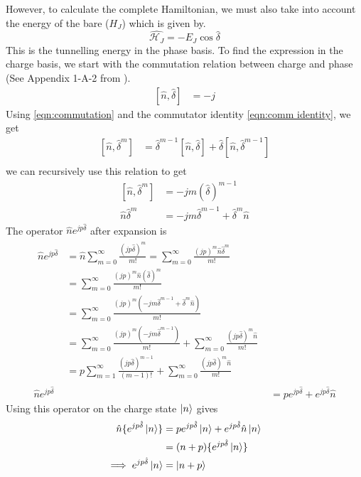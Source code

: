 However, to calculate the complete Hamiltonian, we must also take into account the energy of the bare \JJ ($H_J$) which is given by.
\begin{equation}
\hat{\mathcal{H}_J}=-E_J\cos\hat{\delta}
\end{equation}
This is the tunnelling energy in the phase basis. To find the expression in the charge basis, we start with the commutation relation between charge and phase (See Appendix 1-A-2 from \cite{Cottet2002d}).
\begin{align}
\left[\hat{n},\hat{\delta}\right]&=-j
\label{eqn:commutation}
\end{align}
Using \ref{eqn:commutation} and the commutator identity \ref{eqn:comm identity}, we get
\begin{align}
\left[\hat{n},\hat{\delta}^m\right]&=\hat{\delta}^{m-1}\left[\hat{n},\hat{\delta}\right]+\hat{\delta}\left[\hat{n},\hat{\delta}^{m-1}\right]
\label{eqn:comm identity}\\
\end{align}
we can recursively use this relation to get
\begin{align}
\left[\hat{n},\hat{\delta}^m\right]&=-jm(\hat{\delta})^{m-1}\\
\hat{n}\hat{\delta}^m&=-jm\hat{\delta}^{m-1}+\hat{\delta}^m\hat{n}
\end{align}
The operator $\hat{n}e^{jp\hat{\delta}}$ after expansion is
\begin{align}
\begin{split}
\hat{n}e^{jp\hat{\delta}}&=\hat{n}\sum_{m=0}^\infty \frac{( jp\hat{\delta})^m}{m!}=\sum_{m=0}^\infty \frac{(jp)^m\hat{n}\hat{\delta}^m}{m!}\\
&=\sum_{m=0}^\infty \frac{(jp)^m\hat{n}(\hat{\delta})^m}{m!}\\
&=\sum_{m=0}^\infty \frac{(jp)^m(-jm\hat{\delta}^{m-1}+\hat{\delta}^m\hat{n})}{m!}\\
&=\sum_{m=0}^\infty \frac{(jp)^m(-jm\hat{\delta}^{m-1})}{m!}+\sum_{m=0}^\infty \frac{(jp\hat{\delta})^m\hat{n}}{m!}\\
&=p\sum_{m=1}^\infty \frac{(jp\hat{\delta})^{m-1}}{(m-1)!}+\sum_{m=0}^\infty \frac{(jp\hat{\delta})^m\hat{n}}{m!}
\end{split}\\
\hat{n}e^{jp\hat{\delta}}&=pe^{jp\hat{\delta}}+e^{jp\hat{\delta}}\hat{n}
\end{align}
Using this operator on the charge state $\ket{n}$ gives
\begin{align}
\hat{n}\lbrace e^{jp\hat{\delta}}\ket{n}\rbrace&=pe^{jp\hat{\delta}}\ket{n}+e^{jp\hat{\delta}}\hat{n}\ket{n}\\
&=(n+p)\lbrace e^{jp\hat{\delta}}\ket{n}\rbrace\\
\implies e^{jp\hat{\delta}}\ket{n}&=\ket{n+p}
\end{align}

